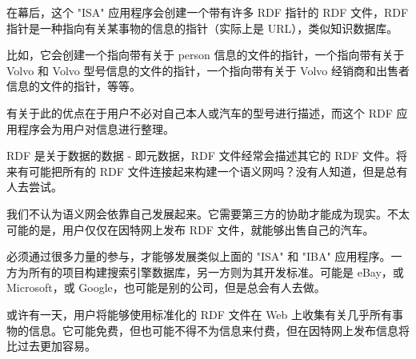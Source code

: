 在幕后，这个 "ISA" 应用程序会创建一个带有许多 RDF 指针的 RDF 文件，RDF 指针是一种指向有关某事物的信息的指针（实际上是 URL），类似知识数据库。

比如，它会创建一个指向带有关于 person 信息的文件的指针，一个指向带有关于 Volvo 和 Volvo 型号信息的文件的指针，一个指向带有关于 Volvo 经销商和出售者信息的文件的指针，等等。


有关于此的优点在于用户不必对自己本人或汽车的型号进行描述，而这个 RDF 应用程序会为用户对信息进行整理。


RDF 是关于数据的数据 - 即元数据，RDF 文件经常会描述其它的 RDF 文件。将来有可能把所有的 RDF 文件连接起来构建一个语义网吗？没有人知道，但是总有人去尝试。


我们不认为语义网会依靠自己发展起来。它需要第三方的协助才能成为现实。不太可能的是，用户仅仅在因特网上发布 RDF 文件，就能够出售自己的汽车。

必须通过很多力量的参与，才能够发展类似上面的 "ISA" 和 "IBA" 应用程序。一方为所有的项目构建搜索引擎数据库，另一方则为其开发标准。可能是 eBay，或 Microsoft，或 Google，也可能是别的公司，但是总会有人去做。


或许有一天，用户将能够使用标准化的 RDF 文件在 Web 上收集有关几乎所有事物的信息。它可能免费，但也可能不得不为信息来付费，但在因特网上发布信息将比过去更加容易。







\clearpage









